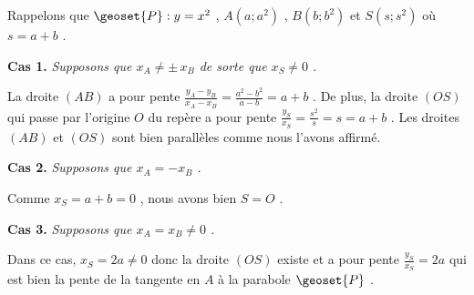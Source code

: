 Rappelons que $\geoset{P} : y = x^2$ , $A(a ; a^2)$ , $B(b ; b^2)$ et $S(s ; s^2)$ où $s = a + b$ .



\bigskip

\textbf{Cas 1.} \emph{Supposons que $x_A \neq \pm \, x_B$ de sorte que $x_S \neq 0$ .}

\medskip

La droite $(AB)$ a pour pente
$\frac{y_A - y_B}{x_A - x_B} = \frac{a^2 - b^2}{a - b} = a + b$ .
De plus, la droite $(OS)$ qui passe par l'origine $O$ du repère a pour pente
$\frac{y_S}{x_S} = \frac{s^2}{s} = s = a + b$ .
Les droites $(AB)$ et $(OS)$ sont bien parallèles comme nous l'avons affirmé.


\bigskip

\textbf{Cas 2.} \emph{Supposons que $x_A = - x_B$ .}

\medskip

Comme $x_S = a + b = 0$ , nous avons bien $S = O$ .


\bigskip

\textbf{Cas 3.} \emph{Supposons que $x_A = x_B \neq 0$ .}

\medskip

Dans ce cas, $x_S = 2a \neq 0$ donc la droite $(OS)$ existe et a pour pente
$\frac{y_S}{x_S} = 2a$ qui est bien la pente de la tangente en $A$ à la parabole $\geoset{P}$ .